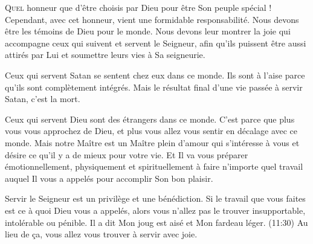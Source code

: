 \dvrule







\lettrine{Q}{uel} honneur que d'être choisis par Dieu
 pour être Son peuple spécial !
 Cependant, avec cet honneur, vient une formidable responsabilité.
 Nous devons être les témoins de Dieu pour le monde.
 Nous devons leur montrer la joie qui accompagne ceux qui suivent
 et servent le Seigneur, afin qu'ils puissent être aussi attirés par Lui
 et soumettre leurs vies à Sa seigneurie. 


Ceux qui servent Satan se sentent chez eux dans ce monde.
 Ils sont à l'aise parce qu'ils sont complètement intégrés.
 Mais le résultat final d'une vie passée à servir Satan, c'est la mort.

Ceux qui servent Dieu sont des étrangers dans ce monde.
 C'est parce que plus vous vous approchez de Dieu,
 et plus vous allez vous sentir en décalage avec ce monde.
 Mais notre Maître est un Maître plein d'amour qui s'intéresse à vous
 et désire ce qu'il y a de mieux pour votre vie.
 Et Il va vous préparer émotionnellement, physiquement et spirituellement
 à faire n'importe quel travail auquel Il vous a appelés
 pour accomplir Son bon plaisir.

Servir le Seigneur est un privilège et une bénédiction.
 Si le travail que vous faites est ce à quoi Dieu vous a appelés,
 alors vous n'allez pas le trouver insupportable, intolérable ou pénible.
 Il a dit\frcolon{} \Og Mon joug est aisé et Mon fardeau léger. \Fg{}
 (11:30)
 Au lieu de \c{c}a, vous allez vous trouver à servir avec joie. 

